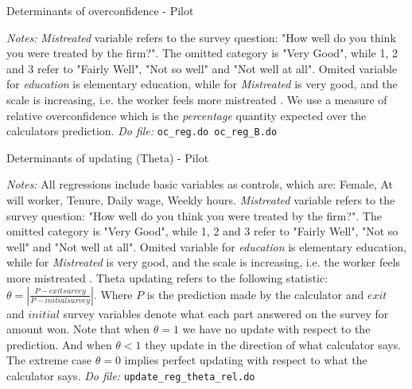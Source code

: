 \documentclass[11pt]{article}
\begin{document}



\begin{landscape}
\begin{table}[H]
\caption{Determinants of overconfidence - Pilot}
\label{Table_determinantsOC}
\begin{center}
\scriptsize{}
\end{center}
 \footnotesize
\textit{Notes:} 
\emph{Mistreated} variable refers to the survey question: "How well do you think you were treated by the firm?". The omitted category is "Very Good", while 1, 2 and 3 refer to "Fairly Well", "Not so well" and "Not well at all".
Omited variable for \emph{education} is elementary education, while for \emph{Mistreated} is very good, and the scale is increasing, i.e. the worker feels more mistreated . We use a measure of relative overconfidence which is the \textit{percentage} quantity expected over the calculators prediction.
\textit{Do file: } \texttt{oc\_reg.do oc\_reg\_B.do}
\end{table}

\pagebreak

\begin{table}[H]
\caption{Determinants of updating (Theta) - Pilot}
\label{Table_determinants_updating}
\begin{center}
\scriptsize{}
\end{center}
 \footnotesize
\textit{Notes:} All regressions include basic variables as controls, which are: Female, At will worker, Tenure, Daily wage, Weekly hours.
\emph{Mistreated} variable refers to the survey question: "How well do you think you were treated by the firm?". The omitted category is "Very Good", while 1, 2 and 3 refer to "Fairly Well", "Not so well" and "Not well at all".
Omited variable for \emph{education} is elementary education, while for \emph{Mistreated} is very good, and the scale is increasing, i.e. the worker feels more mistreated . Theta updating refers to the following statistic: $\theta=\left|\frac{P-exitsurvey}{P-initialsurvey}\right|$. Where $P$ is the prediction made by the calculator and $exit$ and $initial$ survey variables denote what each part answered on the survey for amount won. Note that when $\theta=1$ we have no update with respect to the prediction. And when $\theta<1$ they update in the direction of what calculator says. The extreme case $\theta=0$ implies perfect updating with respect to what the calculator says. 
\textit{Do file: } \texttt{update\_reg\_theta\_rel.do}
\end{table}



\end{landscape}
\end{document}
